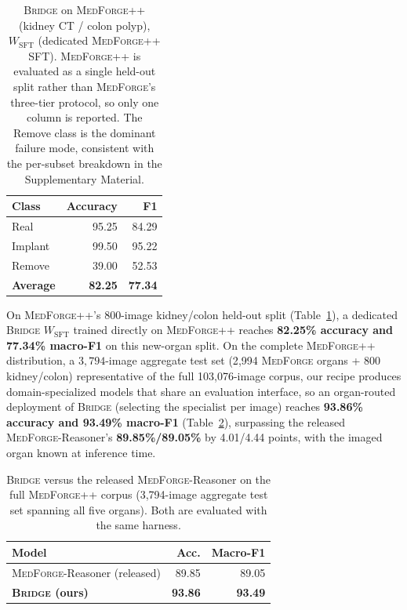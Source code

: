 \documentclass[10pt,twocolumn,letterpaper]{article}
\newcommand{\bridge}{\textsc{Bridge}}
\newcommand{\medforge}{\textsc{MedForge}}
\newcommand{\medforgepp}{\textsc{MedForge++}}
\begin{document}
\begin{table}[t]
\centering
\small
\begin{tabular}{lrr}
\toprule
Class & Accuracy & F1 \\
\midrule
Real & 95.25 & 84.29 \\
Implant & 99.50 & 95.22 \\
Remove & 39.00 & 52.53 \\
\midrule
\textbf{Average} & \textbf{82.25} & \textbf{77.34} \\
\bottomrule
\end{tabular}
\caption{\bridge{} on \medforgepp{} (kidney CT / colon polyp), $W_{\mathrm{SFT}}$ (dedicated \medforgepp{} SFT). \medforgepp{} is evaluated as a single held-out split rather than \medforge{}'s three-tier protocol, so only one column is reported. The Remove class is the dominant failure mode, consistent with the per-subset breakdown in the Supplementary Material.}
\label{tab:bridge-medforgepp}
\end{table}

On \medforgepp{}'s 800-image kidney/colon held-out split (Table~\ref{tab:bridge-medforgepp}), a dedicated \bridge{} $W_{\mathrm{SFT}}$ trained directly on \medforgepp{} reaches \textbf{82.25\% accuracy and 77.34\% macro-F1} on this new-organ split. On the complete \medforgepp{} distribution, a $3{,}794$-image aggregate test set (2{,}994 \medforge{} organs + 800 kidney/colon) representative of the full 103{,}076-image corpus, our recipe produces domain-specialized models that share an evaluation interface, so an organ-routed deployment of \bridge{} (selecting the specialist per image) reaches \textbf{93.86\% accuracy and 93.49\% macro-F1} (Table~\ref{tab:medforgepp-agg}), surpassing the released \medforge{}-Reasoner's \textbf{89.85\%/89.05\%} by 4.01/4.44 points, with the imaged organ known at inference time.

\begin{table}[t]
\centering
\small
\caption{\bridge{} versus the released \medforge{}-Reasoner on the full \medforgepp{} corpus (3{,}794-image aggregate test set spanning all five organs). Both are evaluated with the same harness.}
\label{tab:medforgepp-agg}
\begin{tabular}{lrr}
\toprule
Model & Acc. & Macro-F1 \\
\midrule
\medforge{}-Reasoner (released) & 89.85 & 89.05 \\
\textbf{\bridge{} (ours)} & \textbf{93.86} & \textbf{93.49} \\
\bottomrule
\end{tabular}
\end{table}
\end{document}
